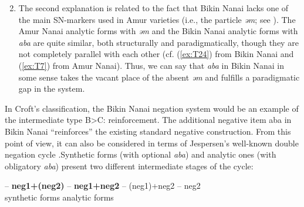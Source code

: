 \documentclass[output=paper]{langscibook}
\begin{document}
\begin{enumerate}
    \setcounter{enumi}{1}
    \item The second explanation is related to the fact that Bikin Nanai lacks one of the main SN-markers used in Amur varieties (i.e., the particle \textit{əm}; see ). The Amur Nanai analytic forms with \textit{əm} and the Bikin Nanai analytic forms with \textit{aba} are quite similar, both structurally and paradigmatically, though they are not completely parallel with each other (cf. (\ref{ex:T24}) from Bikin Nanai and (\ref{ex:T7}) from Amur Nanai). Thus, we can say that \textit{aba} in Bikin Nanai in some sense takes the vacant place of the absent \textit{əm} and fulfills a paradigmatic gap in the system.
\end{enumerate}

In Croft’s \citeyearpar{Croft1991} classification, the Bikin Nanai negation system would be an example of the intermediate type B>C: reinforcement. The additional negative item aba in Bikin Nanai “reinforces” the existing standard negative construction. From this point of view, it can also be considered in terms of Jespersen’s well-known double negation cycle \citep{Jespersen1917, Auwera2009, Auwera2010}.\footnotemark Synthetic forms (with optional \textit{aba}) and analytic ones (with obligatory \textit{aba}) present two different intermediate stages of the cycle:


\let\eachwordon=\upshape
\begin{exe}
    \ex
     {–} \textbf{neg1+(neg2)} – \textbf{neg1+neg2} – (neg1)+neg2 – neg2\\
         { }    { } {synthetic forms}   {} {analytic forms}\\
\end{exe}
\let\eachwordon=\itshape
\end{document}

